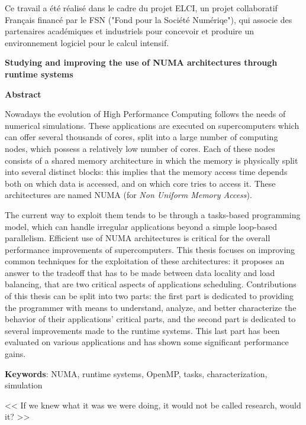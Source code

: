Ce travail a été réalisé dans le cadre du projet ELCI, un projet collaboratif Français financé par le FSN ("Fond pour la Société Numériqe"), qui associe des partenaires académiques et industriels pour concevoir et produire un
environnement logiciel pour le calcul intensif.



\vfill
\pagebreak

\begin{center}\textbf{\large Studying and improving the use of NUMA architectures through runtime systems }

\quad

\textbf{Abstract}
\end{center}


Nowadays the evolution of High Performance Computing follows the needs of numerical simulations.
These applications are executed on supercomputers which can offer several thousands of cores, split into a large number of computing nodes, which possess a relatively low number of cores.
Each of these nodes consists of a shared memory architecture in which the memory is physically split into several distinct blocks: this implies that the memory access time depends both on which data is accessed, and on which core tries to access it.
These architectures are named NUMA (for \emph{Non Uniform Memory Access}).

The current way to exploit them tends to be through a tasks-based programming model, which can handle irregular applications beyond a simple loop-based parallelism.
Efficient use of NUMA architectures is critical for the overall performance improvements of supercomputers.
This thesis focuses on improving common techniques for the exploitation of these architectures: it proposes an answer to the tradeoff that has to be made between data locality and load balancing, that are two critical aspects of applications scheduling.
Contributions of this thesis can be split into two parts: the first part is dedicated to providing the programmer with means to understand, analyze, and better characterize the behavior of their applications' critical parts, and the second part is dedicated to several improvements made to the runtime systems.
This last part has been evaluated on various applications and has shown some significant performance gains.


\quad

\textbf{Keywords}: NUMA, runtime systems, OpenMP, tasks, characterization, simulation

\begin{savequote}[9cm]
<< If we knew what it was we were doing, it would not be called research, would it? >>


\end{savequote}

